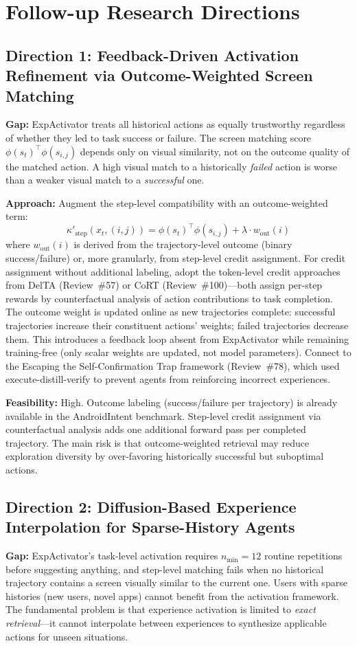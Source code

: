 \documentclass[11pt,a4paper]{article}
\begin{document}
\section{Follow-up Research Directions}

\subsection{Direction 1: Feedback-Driven Activation Refinement via Outcome-Weighted Screen Matching}
\textbf{Gap:} ExpActivator treats all historical actions as equally trustworthy regardless of whether they led to task success or failure. The screen matching score $\phi(s_t)^\top \phi(s_{i,j})$ depends only on visual similarity, not on the outcome quality of the matched action. A high visual match to a historically \emph{failed} action is worse than a weaker visual match to a \emph{successful} one.

\textbf{Approach:} Augment the step-level compatibility with an outcome-weighted term:
\[
\kappa'_{\text{step}}(x_t, (i,j)) = \phi(s_t)^\top \phi(s_{i,j}) + \lambda \cdot w_{\text{out}}(i)
\]
where $w_{\text{out}}(i)$ is derived from the trajectory-level outcome (binary success/failure) or, more granularly, from step-level credit assignment. For credit assignment without additional labeling, adopt the token-level credit approaches from DelTA (Review~\#57) or CoRT (Review~\#100)---both assign per-step rewards by counterfactual analysis of action contributions to task completion. The outcome weight is updated online as new trajectories complete: successful trajectories increase their constituent actions' weights; failed trajectories decrease them. This introduces a feedback loop absent from ExpActivator while remaining training-free (only scalar weights are updated, not model parameters). Connect to the Escaping the Self-Confirmation Trap framework (Review~\#78), which used execute-distill-verify to prevent agents from reinforcing incorrect experiences.

\textbf{Feasibility:} High. Outcome labeling (success/failure per trajectory) is already available in the AndroidIntent benchmark. Step-level credit assignment via counterfactual analysis adds one additional forward pass per completed trajectory. The main risk is that outcome-weighted retrieval may reduce exploration diversity by over-favoring historically successful but suboptimal actions.

\subsection{Direction 2: Diffusion-Based Experience Interpolation for Sparse-History Agents}
\textbf{Gap:} ExpActivator's task-level activation requires $n_{\min}{=}12$ routine repetitions before suggesting anything, and step-level matching fails when no historical trajectory contains a screen visually similar to the current one. Users with sparse histories (new users, novel apps) cannot benefit from the activation framework. The fundamental problem is that experience activation is limited to \emph{exact retrieval}---it cannot interpolate between experiences to synthesize applicable actions for unseen situations.
\end{document}

